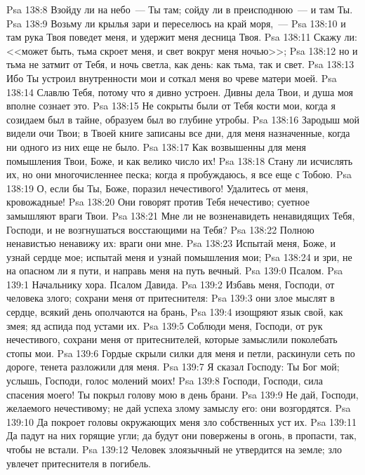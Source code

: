 \vs Psa 138:8 Взойду ли на небо~--- Ты там; сойду ли в преисподнюю~--- и там Ты.
\vs Psa 138:9 Возьму ли крылья зари и переселюсь на край моря,~---
\vs Psa 138:10 и там рука Твоя поведет меня, и удержит меня десница Твоя.
\vs Psa 138:11 Скажу ли: <<может быть, тьма скроет меня, и свет вокруг меня  ночью>>;
\vs Psa 138:12 но и тьма не затмит от Тебя, и ночь светла, как день: как тьма, так и свет.
\vs Psa 138:13 Ибо Ты устроил внутренности мои и соткал меня во чреве матери моей.
\vs Psa 138:14 Славлю Тебя, потому что я дивно устроен. Дивны дела Твои, и душа моя вполне сознает это.
\vs Psa 138:15 Не сокрыты были от Тебя кости мои, когда я созидаем был в тайне, образуем был во глубине утробы.
\vs Psa 138:16 Зародыш мой видели очи Твои; в Твоей книге записаны все дни, для меня назначенные, когда ни одного из них еще не было.
\vs Psa 138:17 Как возвышенны для меня помышления Твои, Боже, и как велико число их!
\vs Psa 138:18 Стану ли исчислять их, но они многочисленнее песка; когда я пробуждаюсь, я все еще с Тобою.
\vs Psa 138:19 О, если бы Ты, Боже, поразил нечестивого! Удалитесь от меня, кровожадные!
\vs Psa 138:20 Они говорят против Тебя нечестиво; суетное замышляют враги Твои.
\vs Psa 138:21 Мне ли не возненавидеть ненавидящих Тебя, Господи, и не возгнушаться восстающими на Тебя?
\vs Psa 138:22 Полною ненавистью ненавижу их: враги они мне.
\vs Psa 138:23 Испытай меня, Боже, и узнай сердце мое; испытай меня и узнай помышления мои;
\vs Psa 138:24 и зри, не на опасном ли я пути, и направь меня на путь вечный.
\vs Psa 139:0 Псалом.
\vs Psa 139:1 Начальнику хора. Псалом Давида.
\rsbpar\vs Psa 139:2 Избавь меня, Господи, от человека злого; сохрани меня от притеснителя:
\vs Psa 139:3 они злое мыслят в сердце, всякий день ополчаются на брань,
\vs Psa 139:4 изощряют язык свой, как змея; яд аспида под устами их.
\vs Psa 139:5 Соблюди меня, Господи, от рук нечестивого, сохрани меня от притеснителей, которые замыслили поколебать стопы мои.
\vs Psa 139:6 Гордые скрыли силки для меня и петли, раскинули сеть по дороге, тенета разложили для меня.
\vs Psa 139:7 Я сказал Господу: Ты Бог мой; услышь, Господи, голос молений моих!
\vs Psa 139:8 Господи, Господи, сила спасения моего! Ты покрыл голову мою в день брани.
\vs Psa 139:9 Не дай, Господи, желаемого нечестивому; не дай успеха злому замыслу его: они возгордятся.
\vs Psa 139:10 Да покроет головы окружающих меня зло собственных уст их.
\vs Psa 139:11 Да падут на них горящие угли; да будут они повержены в огонь, в пропасти, так, чтобы не встали.
\vs Psa 139:12 Человек злоязычный не утвердится на земле; зло увлечет притеснителя в погибель.
